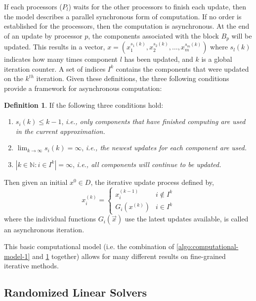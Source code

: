 \documentclass{article}
\theoremstyle{definition}
\newtheorem{definition}{Definition}
\theoremstyle{example}
\theoremstyle{example}
\theoremstyle{example}
\begin{document}
If each processors ($P_l$) waits for the other processors to finish each update, then the model describes a parallel synchronous form of computation. If no order is established for the processors, then the computation is asynchronous. At the end of an update by processor $p$, the components associated with the block $B_p$ will be updated. This results in a vector, $x = (x_1^{s_1(k)}, x_2^{s_2(k)}, \ldots, x_m^{s_m(k)})$ where $s_l(k)$ indicates how many times component $l$ has been updated, and $k$ is a global iteration counter. A set of indices $I^k$ contains the components that were updated on the $k^{th}$ iteration. Given these definitions, the three following conditions provide a framework for asynchronous computation:

\begin{definition}
	\label{def:asynchronous-model}
	If the following three conditions hold:
	\begin{enumerate}
		\item	$s_i(k) \leq k - 1$, {\em i.e., only components that have finished computing are used in the current approximation.}
		\item	$\lim_{k\rightarrow \infty} s_i(k) = \infty$, {\em i.e., the newest updates for each component are used.}
		\item	$|{k \in \mathbb{N}: i \in I^k}| = \infty$, {\em i.e., all components will continue to be updated.}
	\end{enumerate}
	Then given an initial $x^0 \in D$, the iterative update process defined by,
	\[ x_i^{(k)} =
	\begin{cases}
	x_i^{(k-1)} 		& 	i \notin I^k \\
	G_i(x^{(k)}) 		&	i \in    I^k
	\end{cases}
	\]
	where the individual functions $G_i(\vec{x})$ use the latest updates available, is called an asynchronous iteration.
\end{definition}

This basic computational model (i.e. the combination of \cref{algo:computational-model-1} and \cref{def:asynchronous-model} together) allows for many different results on fine-grained iterative methods.


%
\subsection{Randomized Linear Solvers}
\label{sect:randomized-linear-solvers}
\end{document}

